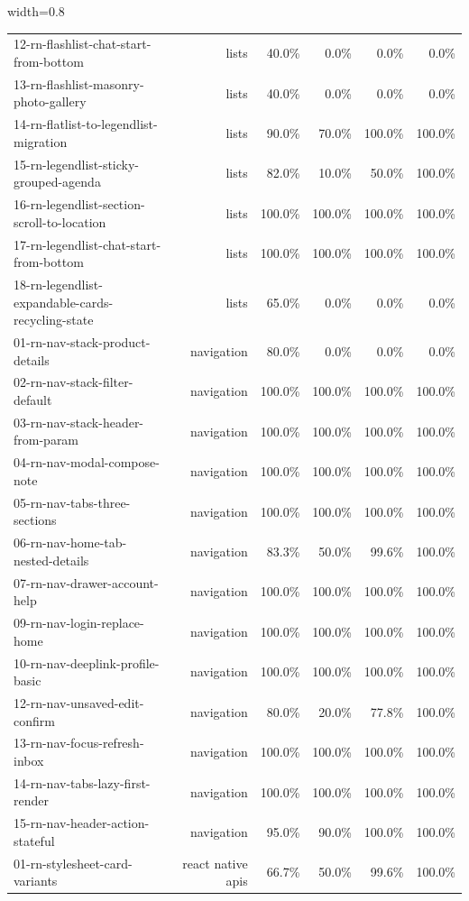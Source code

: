 \begin{table}[htbp]
\begin{adjustbox}{width=0.8\textwidth}
\begin{tabular}{lrrrrr}
12-rn-flashlist-chat-start-from-bottom & lists & 40.0\% & 0.0\% & 0.0\% & 0.0\% \\
13-rn-flashlist-masonry-photo-gallery & lists & 40.0\% & 0.0\% & 0.0\% & 0.0\% \\
14-rn-flatlist-to-legendlist-migration & lists & 90.0\% & 70.0\% & 100.0\% & 100.0\% \\
15-rn-legendlist-sticky-grouped-agenda & lists & 82.0\% & 10.0\% & 50.0\% & 100.0\% \\
16-rn-legendlist-section-scroll-to-location & lists & 100.0\% & 100.0\% & 100.0\% & 100.0\% \\
17-rn-legendlist-chat-start-from-bottom & lists & 100.0\% & 100.0\% & 100.0\% & 100.0\% \\
18-rn-legendlist-expandable-cards-recycling-state & lists & 65.0\% & 0.0\% & 0.0\% & 0.0\% \\
01-rn-nav-stack-product-details & navigation & 80.0\% & 0.0\% & 0.0\% & 0.0\% \\
02-rn-nav-stack-filter-default & navigation & 100.0\% & 100.0\% & 100.0\% & 100.0\% \\
03-rn-nav-stack-header-from-param & navigation & 100.0\% & 100.0\% & 100.0\% & 100.0\% \\
04-rn-nav-modal-compose-note & navigation & 100.0\% & 100.0\% & 100.0\% & 100.0\% \\
05-rn-nav-tabs-three-sections & navigation & 100.0\% & 100.0\% & 100.0\% & 100.0\% \\
06-rn-nav-home-tab-nested-details & navigation & 83.3\% & 50.0\% & 99.6\% & 100.0\% \\
07-rn-nav-drawer-account-help & navigation & 100.0\% & 100.0\% & 100.0\% & 100.0\% \\
09-rn-nav-login-replace-home & navigation & 100.0\% & 100.0\% & 100.0\% & 100.0\% \\
10-rn-nav-deeplink-profile-basic & navigation & 100.0\% & 100.0\% & 100.0\% & 100.0\% \\
12-rn-nav-unsaved-edit-confirm & navigation & 80.0\% & 20.0\% & 77.8\% & 100.0\% \\
13-rn-nav-focus-refresh-inbox & navigation & 100.0\% & 100.0\% & 100.0\% & 100.0\% \\
14-rn-nav-tabs-lazy-first-render & navigation & 100.0\% & 100.0\% & 100.0\% & 100.0\% \\
15-rn-nav-header-action-stateful & navigation & 95.0\% & 90.0\% & 100.0\% & 100.0\% \\
01-rn-stylesheet-card-variants & react native apis & 66.7\% & 50.0\% & 99.6\% & 100.0\% \\

\end{tabular}
\end{adjustbox}
\end{table}
